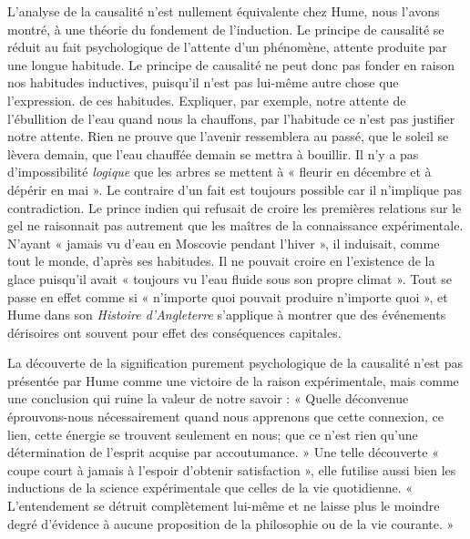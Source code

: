L'analyse de la causalité n’est nullement équivalente
chez Hume, nous l’avons montré, à une théorie du fondement de 
l'induction. Le principe de causalité se réduit au
fait psychologique de l’attente d’un phénomène, attente
produite par une longue habitude. Le principe de causalité
ne peut donc pas fonder en raison nos habitudes inductives, puisqu'il 
n’est pas lui-même autre chose que l’expression. de ces habitudes. 
Expliquer, par exemple, notre
attente de l’ébullition de l’eau quand nous la chauffons,
par l’habitude ce n’est pas justifier notre attente. Rien
ne prouve que l’avenir ressemblera au passé, que le soleil
se lèvera demain, que l’eau chauffée demain se mettra à
bouillir. Il n'y a pas d’impossibilité {\it logique} que les arbres
se mettent à « fleurir en décembre et à dépérir en mai ».
Le contraire d’un fait est toujours possible car il n’implique pas contradiction. 
Le prince indien qui refusait de
croire les premières relations sur le gel ne raisonnait pas
autrement que les maîtres de la connaissance expérimentale. 
N'ayant « jamais vu d’eau en Moscovie pendant
l’hiver », il induisait, comme tout le monde, d’après ses
habitudes. Il ne pouvait croire en l’existence de la glace
puisqu'il avait « toujours vu l’eau fluide sous son propre
climat ». Tout se passe en effet comme si « n’importe
quoi pouvait produire n’importe quoi », et Hume dans son
{\it Histoire d'Angleterre} s’applique à montrer que des événements 
dérisoires ont souvent pour effet des conséquences
capitales.

La découverte de la signification purement psychologique 
de la causalité n’est pas présentée par Hume comme
une victoire de la raison expérimentale, mais comme
une conclusion qui ruine la valeur de notre savoir : « Quelle
déconvenue éprouvons-nous nécessairement quand nous
apprenons que cette connexion, ce lien, cette énergie se
trouvent seulement en nous; que ce n’est rien qu’une détermination 
de l'esprit acquise par accoutumance. » Une
telle découverte « coupe court à jamais à l'espoir d’obtenir
satisfaction », elle futilise aussi bien les inductions de
la science expérimentale que celles de la vie quotidienne.
« L’entendement se détruit complètement lui-même et
ne laisse plus le moindre degré d’évidence à aucune proposition 
de la philosophie ou de la vie courante. »

